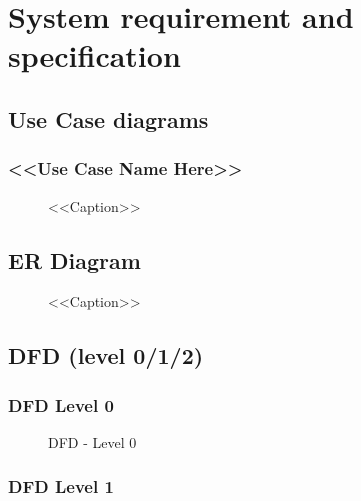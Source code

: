 \chapter{System requirement and specification}


\section{Use Case diagrams}
\subsection{<<Use Case Name Here>>}


\begin{figure}[H]
\centering
\caption{<<Caption>>}
\label{<<Label>>}
\end{figure}



\section{ER Diagram}


\begin{figure}[H]
\centering
\caption{<<Caption>>}
\label{<<Label>>}
\end{figure}



\section{DFD (level 0/1/2)}

\subsection{DFD Level 0}

\begin{figure}[H]
\centering
\caption{DFD - Level 0}
\label{fig:dfd0}
\end{figure}

\subsection{DFD Level 1}

